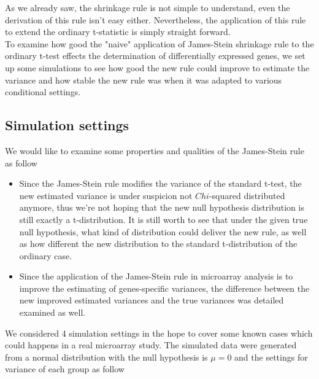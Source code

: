 As we already saw, the shrinkage rule is not simple to understand, even the derivation of this rule isn't easy either. Nevertheless, the application of this rule to extend the ordinary t-statistic is simply straight forward.\\
To examine how good the "naive" application of James-Stein shrinkage rule to the ordinary t-test effects the determination of differentially expressed genes, we set up some simulations to see how good the new rule could improve to estimate the variance and how stable the new rule was when it was adapted to various conditional settings.
\subsection{Simulation settings}
We would like to examine some properties and qualities of the James-Stein rule as follow
\begin{itemize}
	\item Since the James-Stein rule modifies the variance of the standard t-test, the new estimated variance is under suspicion not $Chi$-squared distributed anymore, thus we're not hoping that the new null hypothesis distribution is still exactly a t-distribution. It is still worth to see that under the given true null hypothesis, what kind of distribution could deliver the new rule, as well as how different the new distribution to the standard t-distribution of the ordinary case.
	\item Since the application of the James-Stein rule in microarray analysis is to improve the estimating of genes-specific variances, the difference between the new improved estimated variances and the true variances was detailed examined as well.
\end{itemize}	
We considered 4 simulation settings in the hope to cover some known cases which could happens in a real microarray study. The simulated data were generated from a normal distribution with the null hypothesis is $\mu = 0$ and the settings for variance of each group as follow

